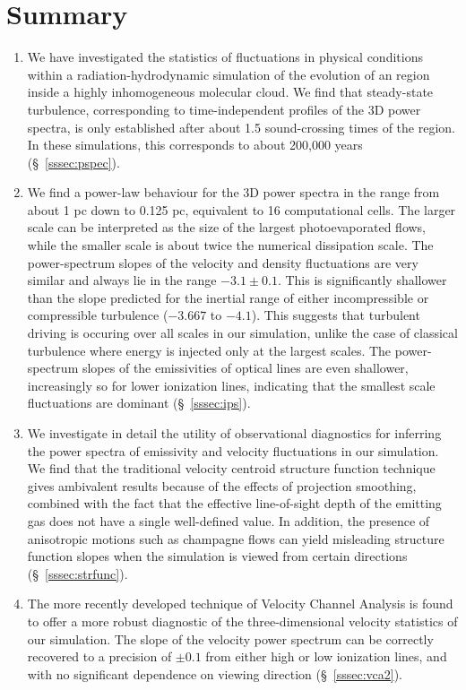 \documentclass[useAMS,usenatbib]{mn2e}
\begin{document}
\section{Summary}
\label{sec:summary}
\begin{enumerate}
\item We have investigated the statistics of fluctuations in physical
  conditions within a radiation-hydrodynamic simulation of the
  evolution of an \hii{} region inside a highly inhomogeneous
  molecular cloud.  We find that steady-state turbulence,
  corresponding to time-independent profiles of the 3D power spectra, is
  only established after about 1.5 sound-crossing times of the \hii{}
  region. In these simulations, this corresponds to about 200,000
  years (\S~\ref{sssec:pspec}).
\item We find a power-law behaviour for the 3D power spectra in the
  range from about 1 pc down to 0.125 pc, equivalent to 16
  computational cells. The larger scale can be interpreted as the size
  of the largest photoevaporated flows, while the smaller scale is
  about twice the numerical dissipation scale.  The power-spectrum
  slopes of the velocity and density fluctuations are very similar and
  always lie in the range \(-3.1 \pm 0.1\).  This is significantly
  shallower than the slope predicted for the inertial range of either
  incompressible or compressible turbulence ($-3.667$ to $-4.1$).
  This suggests that turbulent driving is occuring over all scales in
  our simulation, unlike the case of classical turbulence where energy is
  injected only at the largest scales.  The power-spectrum slopes of
  the emissivities of optical lines are even shallower, increasingly so
  for lower ionization lines, indicating that the smallest scale
  fluctuations are dominant (\S~\ref{sssec:ips}).
\item We investigate in detail the utility of observational
  diagnostics for inferring the power spectra of emissivity and
  velocity fluctuations in our simulation.  We find that the
  traditional velocity centroid structure function technique gives
  ambivalent results because of the effects of projection smoothing,
  combined with the fact that the effective line-of-sight depth of the
  emitting gas does not have a single well-defined value.  In
  addition, the presence of anisotropic motions such as champagne
  flows can yield misleading structure function slopes when the
  simulation is viewed from certain directions (\S~\ref{sssec:strfunc}).
\item The more recently developed technique of Velocity Channel
  Analysis is found to offer a more robust diagnostic of the
  three-dimensional velocity statistics of our simulation.  The slope
  of the velocity power spectrum can be correctly recovered to a precision
  of \(\pm 0.1\) from either high or low ionization lines, and with no
  significant dependence on viewing direction (\S~\ref{sssec:vca2}).
\end{enumerate}
\end{document}
